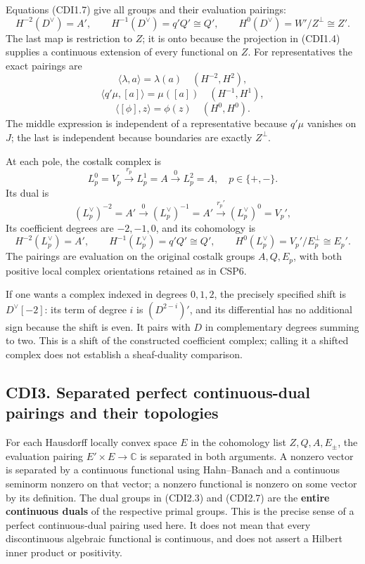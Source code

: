 Equations (CDI1.7) give all groups and their evaluation pairings: \[
H^{-2}(D^\vee)=A',\qquad
H^{-1}(D^\vee)=q'Q'\cong Q',\qquad
H^0(D^\vee)=W'/Z^\perp\cong Z'.
\tag{CDI2.3}
\] The last map is restriction to \(Z\); it is onto because the
projection in (CDI1.4) supplies a continuous extension of every
functional on \(Z\). For representatives the exact pairings are \[
\langle\lambda,a\rangle=\lambda(a)\quad(H^{-2},H^2),
\] \[
\langle q'\mu,[a]\rangle=\mu([a])\quad(H^{-1},H^1),
\] \[
\langle[\phi],z\rangle=\phi(z)\quad(H^0,H^0).
\tag{CDI2.4}
\] The middle expression is independent of a representative because
\(q'\mu\) vanishes on \(J\); the last is independent because boundaries
are exactly \(Z^\perp\).

At each pole, the costalk complex is \[
L_p^0=V_p\xrightarrow{\ r_p\ }L_p^1=A\xrightarrow{\ 0\ }L_p^2=A,
\quad p\in\{+,-\}.
\tag{CDI2.5}
\] Its dual is \[
(L_p^\vee)^{-2}=A'\xrightarrow{0}(L_p^\vee)^{-1}=A'
\xrightarrow{r_p'}(L_p^\vee)^0=V_p',
\tag{CDI2.6}
\] Its coefficient degrees are \(-2,-1,0\), and its cohomology is \[
H^{-2}(L_p^\vee)=A',\qquad
H^{-1}(L_p^\vee)=q'Q'\cong Q',\qquad
H^0(L_p^\vee)=V_p'/E_p^\perp\cong E_p'.
\tag{CDI2.7}
\] The pairings are evaluation on the original costalk groups
\(A,Q,E_p\), with both positive local complex orientations retained as
in CSP6.

If one wants a complex indexed in degrees \(0,1,2\), the precisely
specified shift is \(D^\vee[-2]\): its term of degree \(i\) is
\((D^{2-i})'\), and its differential has no additional sign because the
shift is even. It pairs with \(D\) in complementary degrees summing to
two. This is a shift of the constructed coefficient complex; calling it
a shifted complex does not establish a sheaf-duality comparison.

\subsection{CDI3. Separated perfect continuous-dual pairings and their
topologies}\label{cdi3.-separated-perfect-continuous-dual-pairings-and-their-topologies}

For each Hausdorff locally convex space \(E\) in the cohomology list
\(Z,Q,A,E_\pm\), the evaluation pairing \(E'\times E\to\mathbb C\) is
separated in both arguments. A nonzero vector is separated by a
continuous functional using Hahn--Banach and a continuous seminorm
nonzero on that vector; a nonzero functional is nonzero on some vector
by its definition. The dual groups in (CDI2.3) and (CDI2.7) are the
\textbf{entire continuous duals} of the respective primal groups. This
is the precise sense of a perfect continuous-dual pairing used here. It
does not mean that every discontinuous algebraic functional is
continuous, and does not assert a Hilbert inner product or positivity.

